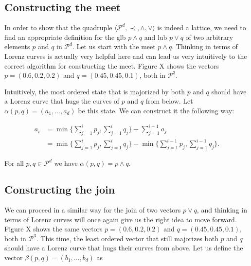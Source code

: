 \subsection{Constructing the meet} \label{sec:meet}

In order to show that the quadruple $\langle \mathcal{P}^d, \prec, \wedge, \vee \rangle$ is indeed a lattice, we need to find an appropriate definition for the glb $p \wedge q$ and lub $p \vee q$ of two arbitrary elements $p$ and $q$ in $\mathcal{P}^d$. Let us start with the meet $p \wedge q$. Thinking in terms of Lorenz curves is actually very helpful here and can lead us very intuitively to the correct algorithm for constructing the meet. Figure X shows the vectors $p = (0.6, 0.2, 0.2)$ and $q = (0.45, 0.45, 0.1)$, both in $\mathcal{P}^3$.

Intuitively, the most ordered state that is majorized by both $p$ and $q$ should have a Lorenz curve that hugs the curves of $p$ and $q$ from below. Let $\alpha(p, q) = (a_1, ..., a_d)$ be this state. We can construct it the following way:

\begin{align}
    a_i &= \min \Big\{ \sum_{j=1}^{i} p_j , \sum_{j=1}^{i} q_j \Big\} - \sum_{j=1}^{i-1} a_j \label{eq:alpha_bis} \\
    &= \min \Big\{ \sum_{j=1}^{i} p_j , \sum_{j=1}^{i} q_j \Big\} - \min \Big\{ \sum_{j=1}^{i-1} p_j , \sum_{j=1}^{i-1} q_j \Big\}. \label{eq:alpha}
\end{align}

\begin{lemma} \label{lem:meet}
    For all $p, q \in \mathcal{P}^d$ we have $\alpha(p, q) = p \wedge q$.
\end{lemma}



\subsection{Constructing the join} \label{sec:join}

We can proceed in a similar way for the join of two vectors $p \vee q$, and thinking in terms of Lorenz curves will once again give us the right idea to move forward. Figure X shows the same vectors $p = (0.6, 0.2, 0.2)$ and $q = (0.45, 0.45, 0.1)$, both in $\mathcal{P}^3$. This time, the least ordered vector that still majorizes both $p$ and $q$ should have a Lorenz curve that hugs their curves from above. Let us define the vector $\beta(p, q) = (b_1, ..., b_d)$ as 

